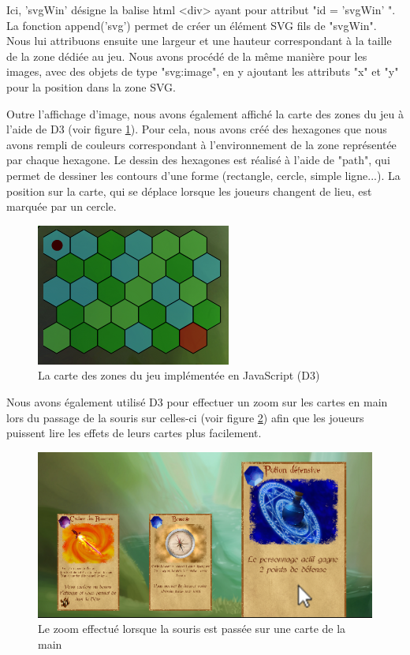 \documentclass[12pt]{report}
\begin{document}
    Ici, 'svgWin' désigne la balise html \textless{}div\textgreater{} ayant pour attribut "id = 'svgWin' ". La fonction append('svg') permet de créer un élément SVG fils de "svgWin". Nous lui attribuons ensuite une largeur et une hauteur correspondant à la taille de la zone dédiée au jeu. Nous avons procédé de la même manière pour les images, avec des objets de type "svg:image", en y ajoutant les attributs "x" et "y" pour la position dans la zone SVG.

    Outre l'affichage d'image, nous avons également affiché la carte des zones du jeu à l'aide de D3 (voir figure \ref{fig:map}). Pour cela, nous avons créé des hexagones que nous avons rempli de couleurs correspondant à l'environnement de la zone représentée par chaque hexagone. Le dessin des hexagones est réalisé à l'aide de "path", qui permet de dessiner les contours d'une forme (rectangle, cercle, simple ligne...). La position sur la carte, qui se déplace lorsque les joueurs changent de lieu, est marquée par un cercle.

		\begin{figure}[h!]
			\centering
			\includegraphics[scale=0.95]{map}
			\caption{La carte des zones du jeu implémentée en JavaScript (D3)}
			\label{fig:map}
		\end{figure}

    Nous avons également utilisé D3 pour effectuer un zoom sur les cartes en main lors du passage de la souris sur celles-ci (voir figure \ref{fig:zoom}) afin que les joueurs puissent lire les effets de leurs cartes plus facilement.

		\begin{figure}[h!]
			\centering
			\includegraphics[scale=0.6]{zoom}
			\caption{Le zoom effectué lorsque la souris est passée sur une carte de la main}
			\label{fig:zoom}
		\end{figure}
\end{document}
